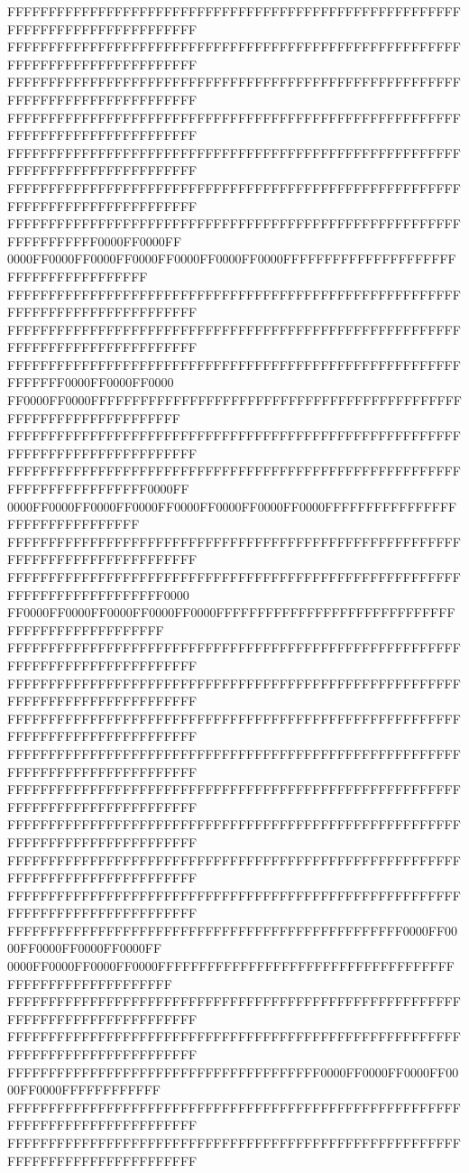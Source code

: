 FFFFFFFFFFFFFFFFFFFFFFFFFFFFFFFFFFFFFFFFFFFFFFFFFFFFFFFFFFFFFFFFFFFFFFFFFFFFFF
FFFFFFFFFFFFFFFFFFFFFFFFFFFFFFFFFFFFFFFFFFFFFFFFFFFFFFFFFFFFFFFFFFFFFFFFFFFFFF
FFFFFFFFFFFFFFFFFFFFFFFFFFFFFFFFFFFFFFFFFFFFFFFFFFFFFFFFFFFFFFFFFFFFFFFFFFFFFF
FFFFFFFFFFFFFFFFFFFFFFFFFFFFFFFFFFFFFFFFFFFFFFFFFFFFFFFFFFFFFFFFFFFFFFFFFFFFFF
FFFFFFFFFFFFFFFFFFFFFFFFFFFFFFFFFFFFFFFFFFFFFFFFFFFFFFFFFFFFFFFFFFFFFFFFFFFFFF
FFFFFFFFFFFFFFFFFFFFFFFFFFFFFFFFFFFFFFFFFFFFFFFFFFFFFFFFFFFFFFFFFFFFFFFFFFFFFF
FFFFFFFFFFFFFFFFFFFFFFFFFFFFFFFFFFFFFFFFFFFFFFFFFFFFFFFFFFFFFFFFFF0000FF0000FF
0000FF0000FF0000FF0000FF0000FF0000FF0000FFFFFFFFFFFFFFFFFFFFFFFFFFFFFFFFFFFFFF
FFFFFFFFFFFFFFFFFFFFFFFFFFFFFFFFFFFFFFFFFFFFFFFFFFFFFFFFFFFFFFFFFFFFFFFFFFFFFF
FFFFFFFFFFFFFFFFFFFFFFFFFFFFFFFFFFFFFFFFFFFFFFFFFFFFFFFFFFFFFFFFFFFFFFFFFFFFFF
FFFFFFFFFFFFFFFFFFFFFFFFFFFFFFFFFFFFFFFFFFFFFFFFFFFFFFFFFFFFFF0000FF0000FF0000
FF0000FF0000FFFFFFFFFFFFFFFFFFFFFFFFFFFFFFFFFFFFFFFFFFFFFFFFFFFFFFFFFFFFFFFFFF
FFFFFFFFFFFFFFFFFFFFFFFFFFFFFFFFFFFFFFFFFFFFFFFFFFFFFFFFFFFFFFFFFFFFFFFFFFFFFF
FFFFFFFFFFFFFFFFFFFFFFFFFFFFFFFFFFFFFFFFFFFFFFFFFFFFFFFFFFFFFFFFFFFFFFFF0000FF
0000FF0000FF0000FF0000FF0000FF0000FF0000FF0000FFFFFFFFFFFFFFFFFFFFFFFFFFFFFFFF
FFFFFFFFFFFFFFFFFFFFFFFFFFFFFFFFFFFFFFFFFFFFFFFFFFFFFFFFFFFFFFFFFFFFFFFFFFFFFF
FFFFFFFFFFFFFFFFFFFFFFFFFFFFFFFFFFFFFFFFFFFFFFFFFFFFFFFFFFFFFFFFFFFFFFFFFF0000
FF0000FF0000FF0000FF0000FF0000FFFFFFFFFFFFFFFFFFFFFFFFFFFFFFFFFFFFFFFFFFFFFFFF
FFFFFFFFFFFFFFFFFFFFFFFFFFFFFFFFFFFFFFFFFFFFFFFFFFFFFFFFFFFFFFFFFFFFFFFFFFFFFF
FFFFFFFFFFFFFFFFFFFFFFFFFFFFFFFFFFFFFFFFFFFFFFFFFFFFFFFFFFFFFFFFFFFFFFFFFFFFFF
FFFFFFFFFFFFFFFFFFFFFFFFFFFFFFFFFFFFFFFFFFFFFFFFFFFFFFFFFFFFFFFFFFFFFFFFFFFFFF
FFFFFFFFFFFFFFFFFFFFFFFFFFFFFFFFFFFFFFFFFFFFFFFFFFFFFFFFFFFFFFFFFFFFFFFFFFFFFF
FFFFFFFFFFFFFFFFFFFFFFFFFFFFFFFFFFFFFFFFFFFFFFFFFFFFFFFFFFFFFFFFFFFFFFFFFFFFFF
FFFFFFFFFFFFFFFFFFFFFFFFFFFFFFFFFFFFFFFFFFFFFFFFFFFFFFFFFFFFFFFFFFFFFFFFFFFFFF
FFFFFFFFFFFFFFFFFFFFFFFFFFFFFFFFFFFFFFFFFFFFFFFFFFFFFFFFFFFFFFFFFFFFFFFFFFFFFF
FFFFFFFFFFFFFFFFFFFFFFFFFFFFFFFFFFFFFFFFFFFFFFFFFFFFFFFFFFFFFFFFFFFFFFFFFFFFFF
FFFFFFFFFFFFFFFFFFFFFFFFFFFFFFFFFFFFFFFFFFFFFFFF0000FF0000FF0000FF0000FF0000FF
0000FF0000FF0000FF0000FFFFFFFFFFFFFFFFFFFFFFFFFFFFFFFFFFFFFFFFFFFFFFFFFFFFFFFF
FFFFFFFFFFFFFFFFFFFFFFFFFFFFFFFFFFFFFFFFFFFFFFFFFFFFFFFFFFFFFFFFFFFFFFFFFFFFFF
FFFFFFFFFFFFFFFFFFFFFFFFFFFFFFFFFFFFFFFFFFFFFFFFFFFFFFFFFFFFFFFFFFFFFFFFFFFFFF
FFFFFFFFFFFFFFFFFFFFFFFFFFFFFFFFFFFFFF0000FF0000FF0000FF0000FF0000FFFFFFFFFFFF
FFFFFFFFFFFFFFFFFFFFFFFFFFFFFFFFFFFFFFFFFFFFFFFFFFFFFFFFFFFFFFFFFFFFFFFFFFFFFF
FFFFFFFFFFFFFFFFFFFFFFFFFFFFFFFFFFFFFFFFFFFFFFFFFFFFFFFFFFFFFFFFFFFFFFFFFFFFFF

